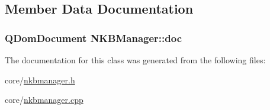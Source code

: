 \subsection{Member Data Documentation}
\hypertarget{class_n_k_b_manager_a4b4018642c7e1a8540ec763fcebaf7e7}{
\subsubsection[{doc}]{\setlength{\rightskip}{0pt plus 5cm}QDomDocument {\bf NKBManager::doc}}}
\label{class_n_k_b_manager_a4b4018642c7e1a8540ec763fcebaf7e7}


The documentation for this class was generated from the following files:\begin{DoxyCompactItemize}
\item 
core/\hyperlink{nkbmanager_8h}{nkbmanager.h}\item 
core/\hyperlink{nkbmanager_8cpp}{nkbmanager.cpp}\end{DoxyCompactItemize}
